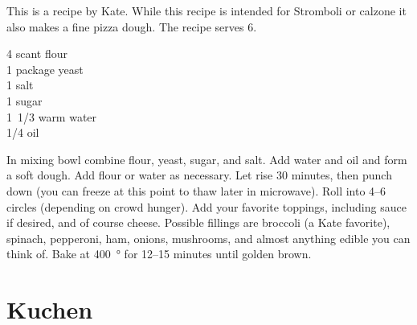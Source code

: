 \begin{open}
  This is a recipe by Kate.  While this recipe is intended for Stromboli
  or calzone it also makes a fine pizza dough.  The
  recipe serves 6.
\end{open}
\begin{ingredients}
  4 scant \si{\cup} flour \\
  1 package  yeast \\
  \SI{1}{\teaspoon} salt \\
  \SI{1}{\tblspoon} sugar \\
  \SI{1/3}[1]{\cup} warm water \\
  \SI{1/4}{\cup} oil
\end{ingredients}
In mixing bowl combine flour, yeast, sugar, and salt.  Add water and oil and
form a soft dough. Add flour or water as necessary.  Let rise 30 minutes, then
punch down (you can freeze at this point to thaw later in microwave).  Roll
into \numrange{4}{6} circles (depending on crowd hunger). Add your favorite
toppings, including sauce if desired, and of course cheese. Possible fillings
are broccoli (a Kate favorite), spinach, pepperoni, ham, onions, mushrooms,
and almost anything edible you can think of. Bake at \SI{400}{\degree} for
\numrange{12}{15} minutes until golden brown.

\section{Kuchen}

